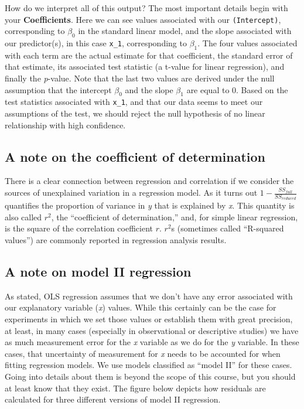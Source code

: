 \documentclass[]{book}
\begin{document}
How do we interpret all of this output? The most important details begin with your \textbf{Coefficients}. Here we can see values associated with our \texttt{(Intercept)}, corresponding to \(\beta_0\) in the standard linear model, and the slope associated with our predictor(s), in this case \texttt{x\_1}, corresponding to \(\beta_1\). The four values associated with each term are the actual estimate for that coefficient, the standard error of that estimate, its associated test statistic (a t-value for linear regression), and finally the \emph{p}-value. Note that the last two values are derived under the null assumption that the intercept \(\beta_0\) and the slope \(\beta_1\) are equal to 0. Based on the test statistics associated with \texttt{x\_1}, and that our data seems to meet our assumptions of the test, we should reject the null hypothesis of no linear relationship with high confidence.

\hypertarget{a-note-on-the-coefficient-of-determination}{%
\subsection{A note on the coefficient of determination}\label{a-note-on-the-coefficient-of-determination}}

There is a clear connection between regression and correlation if we consider the sources of unexplained variation in a regression model. As it turns out \(1-\frac{SS_{full}}{SS_{reduced}}\) quantifies the proportion of variance in \emph{y} that is explained by \emph{x}. This quantity is also called \(r^2\), the ``coefficient of determination,'' and, for simple linear regression, is the square of the correlation coefficient \(r\). \(r^2\)s (sometimes called ``R-squared values'') are commonly reported in regression analysis results.

\hypertarget{a-note-on-model-ii-regression}{%
\subsection{A note on model II regression}\label{a-note-on-model-ii-regression}}

As stated, OLS regression assumes that we don't have any error associated with our explanatory variable (\emph{x}) values. While this certainly can be the case for experiments in which we set those values or establish them with great precision, at least, in many cases (especially in observational or descriptive studies) we have as much measurement error for the \emph{x} variable as we do for the \emph{y} variable. In these cases, that uncertainty of measurement for \emph{x} needs to be accounted for when fitting regression models. We use models classified as ``model II'' for these cases. Going into details about them is beyond the scope of this course, but you should at least know that they exist. The figure below depicts how residuals are calculated for three different versions of model II regression.
\end{document}
